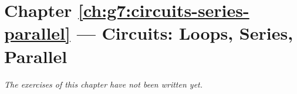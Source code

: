 \section*{Chapter \ref{ch:g7:circuits-series-parallel} --- Circuits: Loops, Series, Parallel}


\emph{The exercises of this chapter have not been written yet.}
